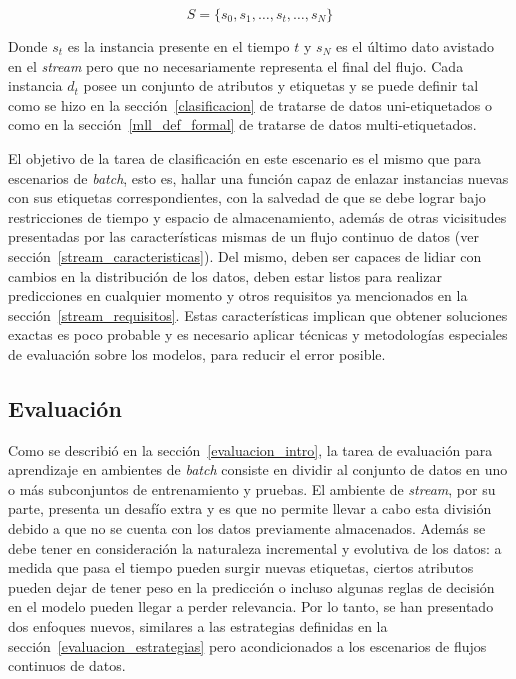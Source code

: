 \begin{equation}
	S = \{s_{0}, s_{1}, \dots, s_{t}, \dots, s_{N}\}
\end{equation}

Donde $s_{t}$ es la instancia presente en el tiempo $t$ y $s_{N}$ es el último
dato avistado en el \textit{stream} pero que no necesariamente representa el
final del flujo. Cada instancia $d_{t}$ posee un conjunto de atributos y
etiquetas y se puede definir tal como se hizo en la sección~\ref{clasificacion}
de tratarse de datos uni-etiquetados o como en la sección~\ref{mll_def_formal}
de tratarse de datos multi-etiquetados.

El objetivo de la tarea de clasificación en este escenario es el mismo que para
escenarios de \textit{batch}, esto es, hallar una función capaz de enlazar
instancias nuevas con sus etiquetas correspondientes, con la salvedad de que se
debe lograr bajo restricciones de tiempo y espacio de almacenamiento, además de
otras vicisitudes presentadas por las características mismas de un flujo
continuo de datos (ver sección~\ref{stream_caracteristicas}). Del mismo, deben
ser capaces de lidiar con cambios en la distribución de los datos, deben estar
listos para realizar predicciones en cualquier momento y otros requisitos ya
mencionados en la sección~\ref{stream_requisitos}. Estas características
implican que obtener soluciones exactas es poco probable y es necesario aplicar
técnicas y metodologías especiales de evaluación sobre los modelos, para reducir
el error posible.


\subsection{Evaluación}
\label{stream_evaluacion}

Como se describió en la sección~\ref{evaluacion_intro}, la tarea de evaluación
para aprendizaje en ambientes de \textit{batch} consiste en dividir al conjunto
de datos en uno o más subconjuntos de entrenamiento y pruebas.  El ambiente de
\textit{stream}, por su parte, presenta un desafío extra y es que no permite
llevar a cabo esta división debido a que no se cuenta con los datos previamente
almacenados. Además se debe tener en consideración la naturaleza incremental y
evolutiva de los datos: a medida que pasa el tiempo pueden surgir nuevas
etiquetas, ciertos atributos pueden dejar de tener peso en la predicción o
incluso algunas reglas de decisión en el modelo pueden llegar a perder
relevancia. Por lo tanto, se han presentado dos enfoques nuevos, similares a las
estrategias definidas en la sección~\ref{evaluacion_estrategias} pero
acondicionados a los escenarios de flujos continuos de datos.

